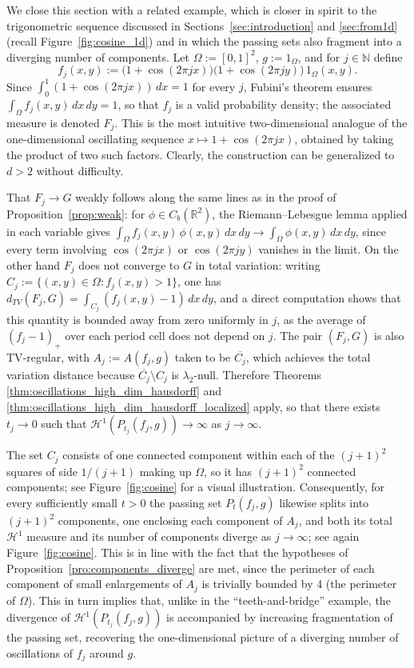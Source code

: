 \documentclass[12pt]{article}
\newcommand{\RR}{\mathbb{R}}
\newcommand{\NN}{\mathbb{N}}
\begin{document}
We close this section with a related example, which is closer
in spirit to the trigonometric sequence
discussed in Sections~\ref{sec:introduction} and \ref{sec:from1d} (recall Figure~\ref{fig:cosine_1d}) and in which the passing sets also fragment into a
diverging number of components. Let $\Omega:=[0,1]^2$, $g:=1_\Omega$, and for $j\in\NN$ define
\begin{equation*}
f_j(x,y) := \bigl(1+\cos(2\pi j x)\bigr)\bigl(1+\cos(2\pi j y)\bigr)\,1_\Omega(x,y).
\end{equation*}
Since $\int_0^1 (1+\cos(2\pi j x))\,dx = 1$ for every $j$, Fubini's theorem ensures $\int_{\Omega} f_j(x,y)\,dx\,dy=1$, so that $f_j$ is a valid probability density; the associated measure is
denoted $F_j$. This is the most intuitive two-dimensional analogue of the
one-dimensional oscillating sequence $x\mapsto 1+\cos(2\pi j x)$, obtained by taking
the product of two such factors. Clearly, the construction can be generalized to $d>2$ without difficulty.

That $F_j\to G$ weakly follows along the same lines as in the proof of Proposition~\ref{prop:weak}: for $\phi\in C_b(\RR^2)$, the Riemann--Lebesgue lemma
applied in each variable gives $\int_\Omega f_j(x,y)\,\phi(x,y)\,dx\,dy \to \int_\Omega \phi(x,y)\,dx\,dy$, since
every term involving $\cos(2\pi j x)$ or $\cos(2\pi j y)$ vanishes in the
limit. On the other hand $F_j$ does not converge to $G$ in total variation: writing
$C_j := \{(x,y)\in\Omega : f_j(x,y)>1\}$, one has
$d_{TV}(F_j,G) = \int_{C_j}(f_j(x,y)-1)\,dx\,dy$, and a direct computation shows that this
quantity is bounded away from zero uniformly in $j$, as the average of
$(f_j-1)_+$ over each period cell does not depend on $j$. The pair $(F_j,G)$ is also
TV-regular, with $A_j := A(f_j,g)$ taken to be $\overline{C_j}$, which achieves the total variation distance because
$\overline{C_j}\setminus C_j$ is $\lambda_2$-null. Therefore Theorems \ref{thm:oscillations_high_dim_hausdorff} and \ref{thm:oscillations_high_dim_hausdorff_localized} apply, so that there exists $t_j\to 0$ such that $\mathcal H^1(P_{t_j}(f_j,g))\to \infty$ as $j\to \infty$. 

The set $C_j$ consists of one connected component within each of the $(j+1)^2$ 
squares of side $1/(j+1)$ making up $\Omega$, so it has $(j+1)^2$ connected
components; see Figure~\ref{fig:cosine} for a visual illustration. Consequently, for every sufficiently small $t>0$ the passing set
$P_t(f_j,g)$ likewise splits into $(j+1)^2$ components, one enclosing
each component of $A_j$, and both its total $\mathcal H^{1}$ measure and its number of
components diverge as $j\to\infty$; see again Figure~\ref{fig:cosine}. This is in line with the fact that the hypotheses
of Proposition~\ref{pro:components_diverge} are met, since the perimeter of each component of small enlargements of $A_j$ is trivially bounded by 4 (the perimeter of $\Omega$). This in turn implies that, unlike in the ``teeth-and-bridge'' example, the divergence of $\mathcal H^{1}(P_{t_j}(f_j,g))$ is
accompanied by increasing fragmentation of the passing set, recovering the one-dimensional picture
of a diverging number of oscillations of $f_j$ around $g$.
\end{document}

